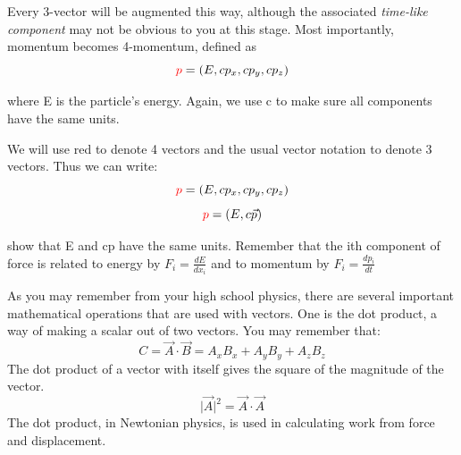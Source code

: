 \noindent Every 3-vector will be augmented this way, although the associated {\it time-like component} may not be obvious to you at this stage.  Most importantly, momentum becomes 4-momentum, defined as
\begin{equation}  
{\color{red} p}=(E,cp_x, cp_y, cp_z)  
\end{equation}

where E is the particle's energy. Again, we use c to make sure all components have the same units.
	 
We will use red to denote 4 vectors and the usual vector notation to denote 3 vectors.  Thus we can write:
\begin{equation} 
\textcolor{red}{p}=(E,cp_x, cp_y, cp_z)  
\end{equation}  		   
\begin{equation} 
{\color{red} p}=(E,c\vec{p})  
\end{equation} 
	
\vspace{.2cm} 
\begin{minipage}{0.9\textwidth} 
\begin{framed}
\begin{exercise}
{show that E and cp have the same units. Remember that the ith component of force is related to energy by $F_i = \frac{dE}{dx_i}$ and to momentum by $F_i = \frac{dp_i}{dt}$}
\end{exercise}
\end{framed} 
\end{minipage}
\vspace{.2cm}



As you may remember from your high school physics, there are several important mathematical operations that are used with vectors.  One is the dot product, a way of making a scalar out of two vectors.  You may remember that:
\begin{equation}
      C= \vec A \cdot \vec B = A_xB_x +A_yB_y +A_zB_z 
\end{equation}
The dot product of a vector with itself gives the square of the magnitude of the vector.
\begin{equation}      
     |{\vec{A}|^2} =\vec A \cdot \vec A  
\end{equation}	  
\noindent The dot product, in Newtonian physics, is used in calculating work from force and displacement.

